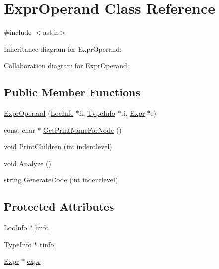 \hypertarget{class_expr_operand}{}\section{Expr\+Operand Class Reference}
\label{class_expr_operand}


{\ttfamily \#include $<$ast.\+h$>$}



Inheritance diagram for Expr\+Operand\+:


Collaboration diagram for Expr\+Operand\+:
\subsection*{Public Member Functions}
\begin{DoxyCompactItemize}
\item 
\hyperlink{class_expr_operand_a2769211a7a5fe60474dc8b332b86b8e2}{Expr\+Operand} (\hyperlink{class_loc_info}{Loc\+Info} $\ast$li, \hyperlink{class_type_info}{Type\+Info} $\ast$ti, \hyperlink{class_expr}{Expr} $\ast$e)
\item 
const char $\ast$ \hyperlink{class_expr_operand_a51b24b2cbb8ff22213783bde2a96642c}{Get\+Print\+Name\+For\+Node} ()
\item 
void \hyperlink{class_expr_operand_a45b3abc5fc95a4184179127f1aed0e94}{Print\+Children} (int indentlevel)
\item 
void \hyperlink{class_expr_operand_a322d7d7cd1aae5b592349824f147b570}{Analyze} ()
\item 
string \hyperlink{class_expr_operand_afed7d58db66e07a07a8edbb10b9a6f5a}{Generate\+Code} (int indentlevel)
\end{DoxyCompactItemize}
\subsection*{Protected Attributes}
\begin{DoxyCompactItemize}
\item 
\hyperlink{class_loc_info}{Loc\+Info} $\ast$ \hyperlink{class_expr_operand_a1f69e2905035f08a4687dc3d3fc913f9}{linfo}
\item 
\hyperlink{class_type_info}{Type\+Info} $\ast$ \hyperlink{class_expr_operand_a30dfef7cd9e9d56a9a02f48080785ab3}{tinfo}
\item 
\hyperlink{class_expr}{Expr} $\ast$ \hyperlink{class_expr_operand_a0912668446b445f8451c9c2b52a969ad}{expr}
\end{DoxyCompactItemize}


